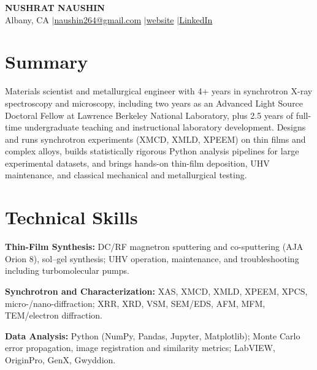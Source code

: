 \documentclass[10pt,letterpaper]{article}
\newcommand{\skillline}[2]{\vspace{0.2em}\noindent\textbf{#1:} #2\par}
\begin{document}
\begin{center}
  {\LARGE\bfseries NUSHRAT NAUSHIN}\\[0.35em]
  Albany, CA \quad$|$\quad \href{mailto:naushin264@gmail.com}{naushin264@gmail.com}
  \quad$|$\quad \href{https://sites.google.com/view/nushrat-naushin/}{website}
  \quad$|$\quad \href{https://www.linkedin.com/in/nushratn/}{LinkedIn}
\end{center}

\section{Summary}

Materials scientist and metallurgical engineer with 4+ years in synchrotron X-ray spectroscopy and
microscopy, including two years as an Advanced Light Source Doctoral Fellow at Lawrence Berkeley
National Laboratory, plus 2.5 years of full-time undergraduate teaching and instructional
laboratory development. Designs and runs synchrotron experiments (XMCD, XMLD, XPEEM) on thin films
and complex alloys, builds statistically rigorous Python analysis pipelines for large experimental
datasets, and brings hands-on thin-film deposition, UHV maintenance, and classical mechanical and
metallurgical testing.

\section{Technical Skills}

\skillline{Thin-Film Synthesis}{DC/RF magnetron sputtering and co-sputtering (AJA Orion 8),
sol--gel synthesis; UHV operation, maintenance, and troubleshooting including turbomolecular pumps.}

\skillline{Synchrotron and Characterization}{XAS, XMCD, XMLD, XPEEM, XPCS, micro-/nano-diffraction;
XRR, XRD, VSM, SEM/EDS, AFM, MFM, TEM/electron diffraction.}

\skillline{Data Analysis}{Python (NumPy, Pandas, Jupyter, Matplotlib); Monte Carlo error
propagation, image registration and similarity metrics; LabVIEW, OriginPro, GenX, Gwyddion.}
\end{document}
